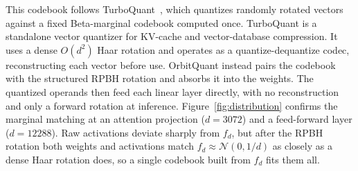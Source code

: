 This codebook follows TurboQuant~\cite{zandieh2025turboquant}, which quantizes randomly rotated vectors against a fixed Beta-marginal codebook computed once. TurboQuant is a standalone vector quantizer for KV-cache and vector-database compression. It uses a dense $O(d^2)$ Haar rotation and operates as a quantize-dequantize codec, reconstructing each vector before use. OrbitQuant instead pairs the codebook with the structured RPBH rotation and absorbs it into the weights. The quantized operands then feed each linear layer directly, with no reconstruction and only a forward rotation at inference.
Figure~\ref{fig:distribution} confirms the marginal matching at an attention projection ($d{=}3072$) and a feed-forward layer ($d{=}12288$). Raw activations deviate sharply from $f_d$, but after the RPBH rotation both weights and activations match $f_d \approx \mathcal{N}(0,1/d)$ as closely as a dense Haar rotation does, so a single codebook built from $f_d$ fits them all.







